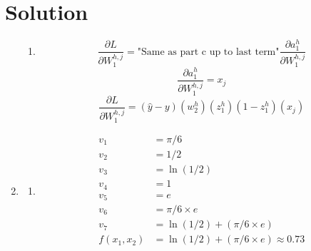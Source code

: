 \documentclass[submit]{harvardml}
\newenvironment{answer}
  {\section*{Solution}}
{}
\begin{document}
\begin{answer}
\begin{enumerate}
\begin{enumerate}
            \item
                    $$\frac {\partial L}{\partial W_1^{h,j}} = \text{"Same as part c up to last term"}\frac {\partial a_1^h}{\partial W_1^{h,j}}$$
                    $$\frac {\partial a_1^h}{\partial W_1^{h,j}} = x_j$$
                    $$\frac {\partial L}{\partial W_1^{h,j}} = (\hat{y}-y)(w_2^h)(z_1^h)(1-z_1^h)(x_j)$$
          \end{enumerate}

    \item

          \begin{enumerate}
            \item
                  \begin{align*}
                    v_1        & = \pi/6 \\
                    v_2        & = 1/2\\
                    v_3        & = \ln(1/2)\\
                    v_4        & = 1\\
                    v_5        & = e\\
                    v_6        & = \pi/6 \times e\\
                    v_7        & = \ln(1/2) + (\pi/6 \times e)\\
                    f(x_1,x_2) & = \ln(1/2) + (\pi/6 \times e) \approx 0.73\\
                  \end{align*}


\end{enumerate}
\end{enumerate}
\end{answer}
\end{document}
